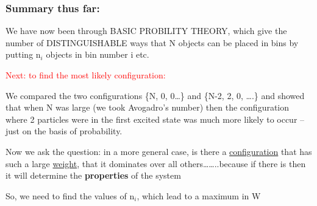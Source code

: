 \documentclass[ignorenonframetext]{beamer}
\begin{document}
\begin{frame}
\frametitle{Summary thus far:}
 
We have now been through BASIC PROBILITY THEORY, which give the number of DISTINGUISHABLE ways that N objects can be placed in bins by putting n\(_i\) objects in bin number i etc.
 
\textcolor{red}{Next: to find the most likely configuration:}
 
We compared the two configurations \{N, 0, 0…\} and  \{N-2, 2, 0, ….\} and showed that when N was large (we took Avogadro's number) then the configuration where 2 particles were in the first excited state was much more likely to occur -- just on the basis of probability.

Now we ask the question: in a more general case, is there a \underline{configuration} that has such a large \underline{weight}, that it dominates over all others……..because if there is then it will determine the \textbf{properties} of the system

So, we need to find the values of n\(_i\), which lead to a maximum in W
\end{frame}
\end{document}
